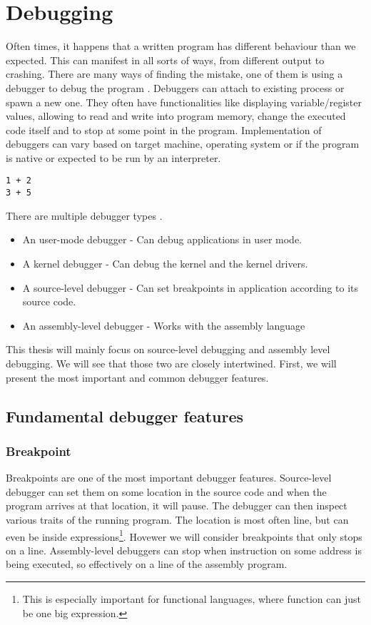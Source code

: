 \chapter{Debugging}
Often times, it happens that a written program has different behaviour than we expected. This can manifest in all sorts of ways, from different output to crashing. There are many ways of finding the mistake, one of them is using a debugger to debug the program \cite{software-debugging-testing-verification}.
Debuggers can attach to existing process or spawn a new one. They often have functionalities like displaying variable/register values, allowing to read and write into program memory, change the executed code itself and to stop at some point in the program. Implementation of debuggers can vary based on target machine, operating system or if the program is native or expected to be run by an interpreter.

\begin{verbatim}
1 + 2
3 + 5
\end{verbatim}

There are multiple debugger types .
\begin{itemize}
    \item An user-mode debugger - Can debug applications in user mode.
    \item A kernel debugger - Can debug the kernel and the kernel drivers.
    \item A source-level debugger - Can set breakpoints in application according to its source code.
    \item An assembly-level debugger - Works with the assembly language
\end{itemize}

This thesis will mainly focus on source-level debugging and assembly level debugging. We will see that those two are closely intertwined. First, we will present the most important and common debugger features.

\section{Fundamental debugger features}
\subsection{Breakpoint}\label{breakpoint}
Breakpoints are one of the most important debugger features. Source-level debugger can set them on some location in the source code and when the program arrives at that location, it will pause. The debugger can then inspect various traits of the running program. The location is most often line, but can even be inside expressions\footnote{This is especially important for functional languages, where function can just be one big expression.}. Hovewer we will consider breakpoints that only stops on a line. Assembly-level debuggers can stop when instruction on some address is being executed, so effectively on a line of the assembly program.

